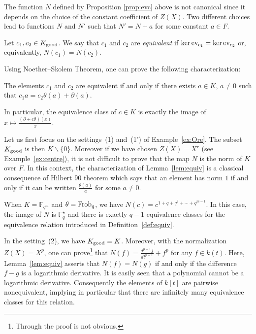 \documentclass[a4paper]{llncs}
\newcommand{\FF}{\mathbb F}
\newcommand{\Frob}{\textrm{\rm Frob}}
\newcommand{\ev}[1]{\textrm{\rm ev}_{#1}}
\newcommand{\good}{\textrm{\rm good}}
\begin{document}
\begin{remark}
The function $N$ defined by Proposition \ref{prop:evc} above is not 
canonical since it depends on the choice of the constant coefficient 
of $Z(X)$. Two different choices lead to functions $N$ and $N'$ such
that $N' = N + a$ for some constant $a \in F$.
\end{remark}


\begin{definition}
\label{def:equiv}
Let $c_1, c_2 \in K_\good$.
We say that $c_1$ and $c_2$ are \emph{equivalent} if
$\ker \ev{c_1} = \ker \ev{c_2}$ or, equivalently, $N(c_1) = N(c_2)$.
\end{definition}

\noindent
Using Noether--Skolem Theorem, one can prove the following
characterization:

\begin{lemma}
\label{lem:equiv}
The elements $c_1$ and $c_2$ are equivalent if and only if there exists 
$a \in K$, $a \neq 0$ such that $c_1 a = c_2 \theta(a) + \partial(a)$.

\noindent
In particular, the equivalence class of $c \in K$ is exactly the image 
of $x \mapsto \frac{(\partial + c\theta)(x)} x$.
\end{lemma}

{\small
\begin{example}
\label{ex:equiv}
Let us first focus on the settings~(1) and~(1') of Example~\ref{ex:Ore}. 
The subset $K_\good$ is then $K \backslash \{0\}$. Moreover if we have 
chosen $Z(X) = X^r$ (see Example~\ref{ex:centre}), it is not difficult
to prove that the map $N$ is the norm of $K$ over $F$.
In this context, the characterization of Lemma~\ref{lem:equiv} is 
a classical consequence of Hilbert 90 theorem which says that an
element has norm $1$ if and only if it can be written 
$\frac{\theta(a)} a$ for some $a \neq 0$.

\noindent
When $K = \FF_{q^m}$ and $\theta = \Frob_q$, we have 
$N(c) = c^{1 + q + q^2 + \cdots + q^{m-1}}$. In this case, the image of 
$N$ is $\FF_q^\star$ and there is exactly $q{-}1$ equivalence classes 
for the equivalence relation introduced in Definition~\ref{def:equiv}.

In the setting~(2), we have $K_\good = K$. Moreover, with the 
normalization $Z(X) = X^p$, one can prove\footnote{Through the proof is 
not obvious.} that $N(f) = \frac {d^{p-1}f}{dt^{p-1}} + f^p$ for any $f 
\in k(t)$. Here, Lemma~\ref{lem:equiv} asserts that $N(f) = N(g)$ if
and only if the difference $f-g$ is a logarithmic derivative.
It is easily seen that a polynomial cannot be a logarithmic derivative.
Consequently the elements of $k[t]$ are pairwise nonequivalent,
implying in particular that there are infinitely many equivalence
classes for this relation.
\end{example}}
\end{document}
